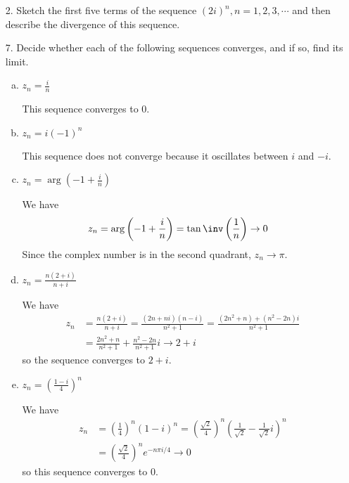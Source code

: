 \documentclass{article}
\begin{document}
\begin{itemize}
	\item[2.] Sketch the first five terms of the sequence $(2i)^n, n=1, 2, 3, \cdots$ and then describe the divergence of this sequence.

	\item[7.] Decide whether each of the following sequences converges, and if so, find its limit.
		\begin{enumerate}[(a)]
			\item $z_n=\frac{i}{n}$
				\begin{soln}
					This sequence converges to 0.
				\end{soln}

			\item $z_n=i(-1)^n$
				\begin{soln}
					This sequence does not converge because it oscillates between $i$ and $-i.$
				\end{soln}

			\item $z_n=\arg\left( -1+\frac{i}{n} \right)$
				\begin{soln}
					We have 
					\begin{align*}
						z_n &= \arg\left( -1+\frac{i}{n} \right) = \tan\inv\left( \frac{1}{n} \right) \to 0
					\end{align*}
					Since the complex number is in the second quadrant, $z_n\to \pi.$
				\end{soln}

			\item $z_n=\frac{n(2+i)}{n+i}$
				\begin{soln}
					We have
					\begin{align*}
						z_n &= \frac{n(2+i)}{n+i} = \frac{(2n+ni)(n-i)}{n^2+1} = \frac{(2n^2+n) + (n^2-2n)i}{n^2+1} \\
						&= \frac{2n^2+n}{n^2+1} + \frac{n^2-2n}{n^2+1}i \to 2 + i
					\end{align*}
					so the sequence converges to $2+i.$
				\end{soln}

			\item $z_n=\left( \frac{1-i}{4} \right)^n$
				\begin{soln}
					We have
					\begin{align*}
						z_n &= \left( \frac{1}{4} \right)^n (1-i)^n = \left( \frac{\sqrt{2}}{4} \right)^n \left( \frac{1}{\sqrt{2}} - \frac{1}{\sqrt{2}}i \right)^n \\
						&= \left( \frac{\sqrt{2}}{4} \right)^n e^{-n\pi i/4} \to 0
					\end{align*}
					so this sequence converges to 0.
				\end{soln}
				

\end{enumerate}
\end{itemize}
\end{document}
